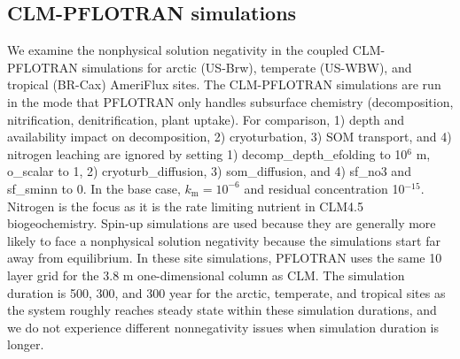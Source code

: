 \documentclass[gmd, manuscript]{copernicus}
\begin{document}
%

\subsection{CLM-PFLOTRAN simulations}
We examine the nonphysical solution negativity in the coupled CLM-PFLOTRAN simulations
for arctic (US-Brw), temperate (US-WBW), and tropical (BR-Cax) AmeriFlux sites. 
The CLM-PFLOTRAN simulations are run in the mode that PFLOTRAN only handles
subsurface chemistry (decomposition, nitrification, denitrification, 
plant uptake). For comparison, 1) depth and 
availability impact on decomposition, 2) cryoturbation, 3) SOM transport,
and 4) nitrogen leaching 
are ignored by setting 1) decomp\_depth\_efolding to 10$^6$ m, o\_scalar to 1,
2) cryoturb\_diffusion, 3) som\_diffusion, and 4) sf\_no3 and sf\_sminn to 0. In the base case, 
$k_\text{m}=10^{-6}$ and residual concentration 10$^{-15}$.
Nitrogen is the focus
as it is the rate limiting nutrient in CLM4.5 biogeochemistry. Spin-up
simulations are used because they are generally more likely to face a nonphysical solution negativity 
because the simulations start far away from equilibrium. In these site
simulations, PFLOTRAN uses the same 10 layer grid for the 3.8 m one-dimensional
column as CLM. The simulation duration is 500, 300, and 300 year for the
arctic, temperate, and tropical sites as the system roughly reaches steady state
within these simulation durations, and we do not experience different nonnegativity issues when simulation duration is longer. 

\end{document}
